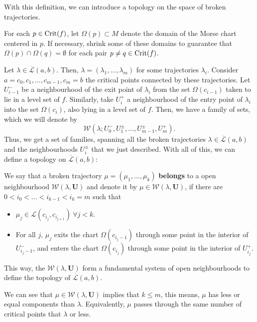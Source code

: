 With this definition, we can introduce a topology on the space of broken trajectories.

For each $p \in \mathrm{Crit}(f)$, let $\Omega(p) \subset M$ denote the domain of the Morse chart centered in $p$. If necessary, shrink some of these domains to guarantee that $\Omega(p) \cap \Omega(q) = \emptyset$ for each pair $p \neq q \in \mathrm{Crit}(f)$.

Let $\lambda \in \overline{\mathcal{L}}(a,b)$. Then, $\lambda = (\lambda_1,...,\lambda_m)$ for some trajectories $\lambda_i$. Consider $a = c_0, c_1, ..., c_{m-1}, c_m = b$ the critical points connected by these trajectories. Let $U_{i-1}^{-}$ be a neighbourhood of the exit point of $\lambda_i$ from the set $\Omega(c_{i-1})$ taken to lie in a level set of $f$. Similarly, take $U_i^+$ a neighbourhood of the entry point of $\lambda_i$ into the set $\Omega(c_i)$, also lying in a level set of $f$. Then, we have a family of sets, which we will denote by
\[\mathcal{W}(\lambda; U_0^{-}, U_1^{\pm},...,U_{m-1}^{\pm},U_m^{+}) .\]
Thus, we get a set of families, spanning all the broken trajectories $\lambda \in \overline{\mathcal{L}}(a,b)$ and the neighbourhoods $U_i^{\pm}$ that we just described. With all of this, we can define a topology on $\overline{\mathcal{L}}(a,b)$:

\begin{deff}
We say that a broken trajectory $\mu = (\mu_1,...,\mu_k)$ {\bf belongs} to a open neighbourhood $\mathcal{W}(\lambda,\mathbf{U})$ and denote it by $\mu \in \mathcal{W}(\lambda, \mathbf{U})$, if there are $0 < i_0 < ... < i_{k-1} < i_k = m$ such that

\begin{itemize}
	\item $\mu_j \in \mathcal{L}(c_{i_j},c_{i_{j+1}}) \ \forall j < k$.
	\item For all $j$, $\mu_j$ exits the chart $\Omega(c_{i_j-1})$ through some point in the interior of $U_{i_j-1}^{-}$, and enters the chart $\Omega(c_{i_j})$ through some point in the interior of $U_{i_j}^+$.
\end{itemize}

This way, the $\mathcal{W}(\lambda,\mathbf{U})$ form a fundamental system of open neighbourhoods to define the topology of $\overline{\mathcal{L}}(a,b)$.
\end{deff}

\begin{rmrk}
We can see that $\mu \in \mathcal{W}(\lambda, \mathbf{U})$ implies that $k \leq m$, this means, $\mu$ has less or equal components than $\lambda$. Equivalently, $\mu$ passes through the same number of critical points that $\lambda$ or less.
\end{rmrk}

